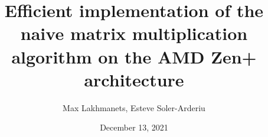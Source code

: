\documentclass[]{report}
\begin{document}
    \title{
        Efficient implementation of the naive matrix multiplication algorithm on
        the AMD Zen+ architecture
    }
    \author{Max Lakhmanets, Esteve Soler-Arderiu}
    \date{December 13, 2021}
    \maketitle

    
    
\end{document}
